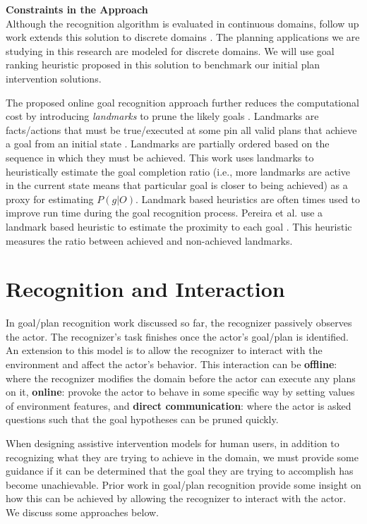 \noindent\textbf{Constraints in the Approach}\\
Although the recognition algorithm is evaluated in continuous domains, follow up work extends this solution to discrete domains \cite{vered2018goalrec}. The planning applications we are studying in this research are modeled for discrete domains. We will use goal ranking heuristic proposed in this solution to benchmark our initial plan intervention solutions.

The proposed online goal recognition approach further reduces the computational cost by introducing \textit{landmarks} to prune the likely goals \cite{vered2018goalrec}. 
Landmarks are facts/actions that must be true/executed at some pin all valid plans that achieve a goal from an initial state \cite{hoffman2004lm}. Landmarks are partially ordered based on the sequence in which they must be achieved. This work uses landmarks to heuristically estimate the goal completion ratio (i.e., more landmarks are active in the current state means that particular goal is closer to being achieved) as a proxy for estimating $P(g|O)$. Landmark based heuristics are often times used to improve run time during the goal recognition process. Pereira et al. use a landmark based heuristic to estimate the proximity to each goal \cite{pereira2017}. This heuristic measures the ratio between achieved and non-achieved landmarks.


\section{Recognition and Interaction}
In goal/plan recognition  work discussed so far, the recognizer passively observes the actor. The recognizer's task finishes once the actor's goal/plan is identified. An extension to this model is to allow the recognizer to interact with the environment and affect the actor's behavior. This interaction can be \textbf{offline}: where the recognizer modifies the domain before the actor can execute any plans on it, \textbf{online}: provoke the actor to behave in some specific way by setting values of environment features, and \textbf{direct communication}: where the actor is asked questions such that the goal hypotheses can be pruned quickly. 

When designing assistive intervention models for human users, in addition to recognizing what they are trying to achieve in the domain, we must provide some guidance if it can be determined that the goal they are trying to accomplish has become unachievable. Prior work in goal/plan recognition provide some insight on how this can be achieved by allowing the recognizer to interact with the actor. We discuss some approaches below.

